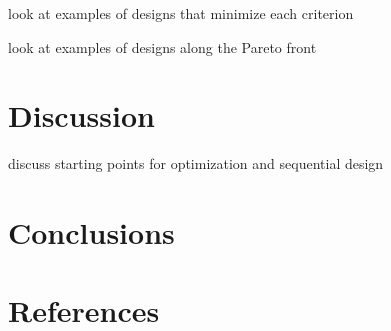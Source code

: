 \documentclass[review]{elsarticle}
\begin{document}
look at examples of designs that minimize each criterion

look at examples of designs along the Pareto front


\section{Discussion}

discuss starting points for optimization and sequential design


\section{Conclusions}



\section*{References}


\end{document}
